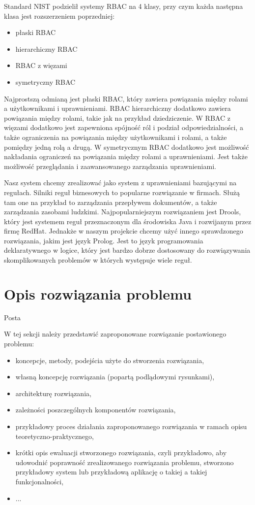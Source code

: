 \documentclass{classrep}
\begin{document}
Standard NIST podzielił systemy RBAC na 4 klasy, przy czym każda następna klasa jest rozszerzeniem poprzedniej:
\begin{itemize}
\item płaski RBAC
\item hierarchiczny RBAC
\item RBAC z więzami
\item symetryczny RBAC
\end{itemize}
Najprostszą odmianą jest płaski RBAC, który zawiera powiązania między rolami a użytkownikami i uprawnieniami. RBAC hierarchiczny dodatkowo zawiera powiązania między rolami,
takie jak na przykład dziedziczenie. W RBAC z więzami dodatkowo jest zapewniona spójność ról i podział odpowiedzialności, a także ograniczenia na powiązania między użytkownikami
i rolami, a także pomiędzy jedną rolą a drugą. W symetrycznym RBAC dodatkowo jest możliwość nakładania ograniczeń na powiązania między rolami a uprawnieniami. Jest także możliwość przeglądania
i zaawansowanego zarządzania uprawnieniami.

Nasz system chcemy zrealizować jako system z uprawnieniami bazującymi na regułach. Silniki reguł biznesowych to popularne rozwiązanie w firmach. Służą tam one na przykład to zarządzania
przepływem dokumentów, a także zarządzania zasobami ludzkimi. Najpopularniejszym rozwiązaniem jest Drools\cite{Drools}, który jest systemem reguł przeznaczonym dla środowiska Java i rozwijanym
przez firmę RedHat. Jednakże w naszym projekcie chcemy użyć innego sprawdzonego rozwiązania, jakim jest język Prolog\cite{Prolog}. Jest to język programowania deklaratywnego w logice,
który jest bardzo dobrze dostosowany do rozwiązywania skomplikowanych problemów w których występuje wiele reguł. 
\section{Opis rozwiązania problemu}
Posta

W tej sekcji należy przedstawić zaproponowane rozwiązanie postawionego problemu:
\begin{itemize}
\item koncepcje, metody, podejścia użyte do stworzenia rozwiązania,
\item własną koncepcję rozwiązania (popartą podlądowymi rysunkami),
\item architekturę rozwiązania,
\item zależności poszczególnych komponentów rozwiązania,
\item przykładowy proces działania zaproponowanego rozwiązania w ramach opisu teoretyczno-praktycznego,
\item krótki opis ewaluacji stworzonego rozwiązania, czyli przykładowo, aby udowodnić poprawność zrealizowanego rozwiązania problemu, stworzono przykładowy system lub przykładową aplikację o takiej a takiej funkcjonalności,
\item ...
\end{itemize}
\end{document}
